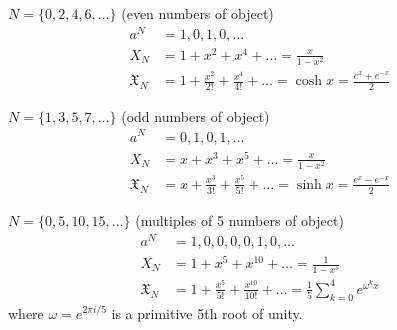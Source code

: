 \documentclass[12pt]{article}
\begin{document}
\eg $N=\{0,2,4,6,\dots\}$ \hfill(even numbers of object)\begin{align*}
    a^N &= 1,0,1,0,\dots\\
    X_N &= 1+x^2 +x^4+\dots = \frac{x}{1-x^2}\\
    \mathfrak{X}_N &= 1+\frac{x^2}{2!}+\frac{x^4}{4!}+\dots = \cosh x = \frac{e^x+e^{-x}}{2}
\end{align*}

\eg $N=\{1,3,5,7,\dots\}$ \hfill(odd numbers of object)\begin{align*}
    a^N &= 0,1,0,1,\dots\\
    X_N &= x+x^3 +x^5+\dots = \frac{x}{1-x^2}\\
    \mathfrak{X}_N &= x+\frac{x^3}{3!}+\frac{x^5}{5!}+\dots = \sinh x = \frac{e^x-e^{-x}}{2}
\end{align*}

\eg $N=\{0,5,10,15,\dots\}$ \hfill(multiples of 5 numbers of object)\begin{align*}
    a^N &= 1,0,0,0,0,1,0,\dots\\
    X_N &= 1+x^5 +x^10+\dots = \frac{1}{1-x^5}\\
    \mathfrak{X}_N &= 1+\frac{x^5}{5!}+\frac{x^{10}}{10!}+\dots = \frac{1}{5}\sum_{k=0}^{4}e^{\omega^k x}
\end{align*}
where $\omega=e^{2\pi i/5}$ is a primitive 5th root of unity.
\end{document}
